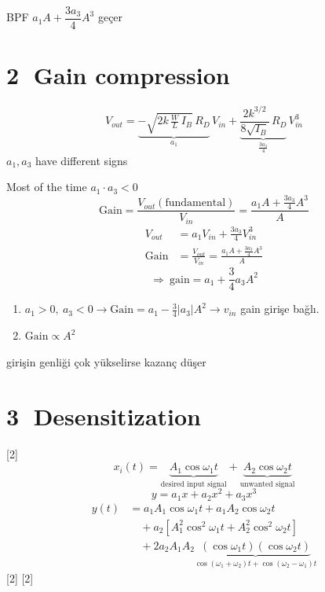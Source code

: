 \documentclass[11pt,a4paper]{article}
\begin{document}
BPF \quad $a_1A+\dfrac{3a_3}{4}A^3$ geçer

\section{\textcircled{2} Gain compression}
\[ V_{out} = \underbrace{-\sqrt{2k\,\tfrac{W}{L}\,I_B}\,R_D}_{a_1}\,V_{in} + \underbrace{\frac{2k^{3/2}}{8\sqrt{I_B}}\,R_D}_{\frac{3a_3}{4}}\,V_{in}^3 \]
$a_1, a_3$ have different signs

Most of the time \quad $a_1\cdot a_3<0$
\[ \mathrm{Gain} = \frac{V_{out}(\text{fundamental})}{V_{in}} = \frac{a_1A+\frac{3a_3}{4}A^3}{A} \]
\begin{align*}
V_{out} &= a_1V_{in}+\frac{3a_3}{4}V_{in}^3\\
\mathrm{Gain} &= \frac{V_{out}}{V_{in}} = \frac{a_1A+\frac{3a_3}{4}A^3}{A}
\end{align*}
\[ \Rightarrow\ \mathrm{gain} = a_1+\frac{3}{4}a_3A^2 \]
\begin{enumerate}[label=\arabic*)]
\item $a_1>0,\ a_3<0 \to \mathrm{Gain}=a_1-\frac{3}{4}|a_3|A^2 \to v_{in}$ \qquad gain girişe bağlı.
\item $\mathrm{Gain}\propto A^2$
\end{enumerate}
girişin genliği çok yükselirse kazanç düşer

\section{\textcircled{3} Desensitization}
[2]
\[ x_i(t) = \underbrace{A_1\cos\omega_1 t}_{\text{desired input signal}} + \underbrace{A_2\cos\omega_2 t}_{\text{unwanted signal}} \]
\[ y = a_1x+a_2x^2+a_3x^3 \]
\begin{align*}
y(t) &= a_1A_1\cos\omega_1 t + a_1A_2\cos\omega_2 t\\
&\quad + a_2\left[A_1^2\cos^2\omega_1 t + A_2^2\cos^2\omega_2 t\right]\\
&\quad + 2a_2A_1A_2\underbrace{(\cos\omega_1 t)(\cos\omega_2 t)}_{\cos(\omega_1+\omega_2)t+\cos(\omega_2-\omega_1)t}
\end{align*}
[2]
[2]
\end{document}
